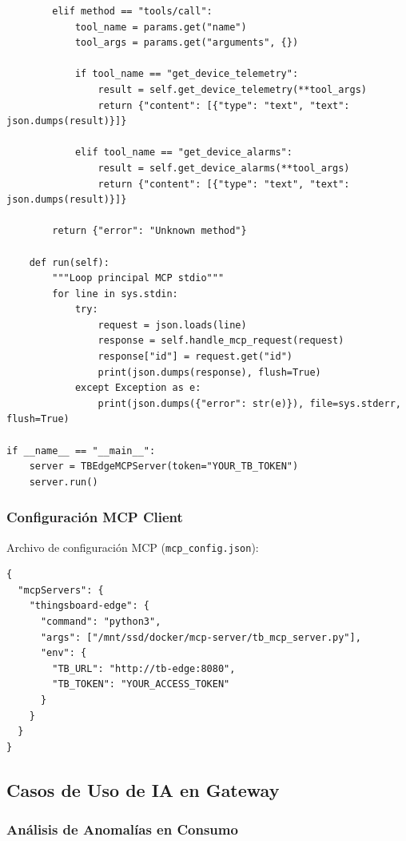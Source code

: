 \begin{verbatim}
        elif method == "tools/call":
            tool_name = params.get("name")
            tool_args = params.get("arguments", {})
            
            if tool_name == "get_device_telemetry":
                result = self.get_device_telemetry(**tool_args)
                return {"content": [{"type": "text", "text": json.dumps(result)}]}
            
            elif tool_name == "get_device_alarms":
                result = self.get_device_alarms(**tool_args)
                return {"content": [{"type": "text", "text": json.dumps(result)}]}
        
        return {"error": "Unknown method"}

    def run(self):
        """Loop principal MCP stdio"""
        for line in sys.stdin:
            try:
                request = json.loads(line)
                response = self.handle_mcp_request(request)
                response["id"] = request.get("id")
                print(json.dumps(response), flush=True)
            except Exception as e:
                print(json.dumps({"error": str(e)}), file=sys.stderr, flush=True)

if __name__ == "__main__":
    server = TBEdgeMCPServer(token="YOUR_TB_TOKEN")
    server.run()
\end{verbatim}

\subsubsection{Configuración MCP Client}

Archivo de configuración MCP (\texttt{mcp\_config.json}):
\begin{verbatim}
{
  "mcpServers": {
    "thingsboard-edge": {
      "command": "python3",
      "args": ["/mnt/ssd/docker/mcp-server/tb_mcp_server.py"],
      "env": {
        "TB_URL": "http://tb-edge:8080",
        "TB_TOKEN": "YOUR_ACCESS_TOKEN"
      }
    }
  }
}
\end{verbatim}

\subsection{Casos de Uso de IA en Gateway}

\subsubsection{Análisis de Anomalías en Consumo}

